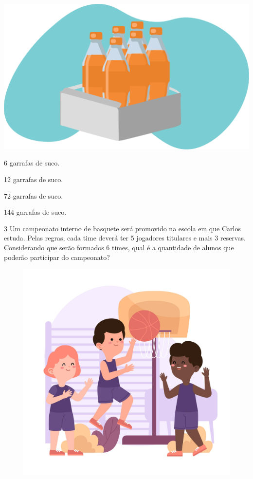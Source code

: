 \begin{minipage}{.5\textwidth}
\includegraphics[width=\textwidth]{./media/image26.png}
\end{minipage}
\begin{minipage}{.5\textwidth}
\begin{escolha}
\item
  6 garrafas de suco.
\item
  12 garrafas de suco.
\item
  72 garrafas de suco.
\item
  144 garrafas de suco.
\end{escolha}
\end{minipage}

\num{3} Um campeonato interno de basquete será promovido na escola em que Carlos
estuda. Pelas regras, cada time deverá ter 5 jogadores titulares e mais 3 reservas. Considerando que serão formados 6 times, qual é a quantidade de alunos que poderão participar do campeonato?

\begin{figure}[htpb!]
\centering
\includegraphics[width=.6\textwidth]{./media/image16e.jpeg}
\end{figure}

